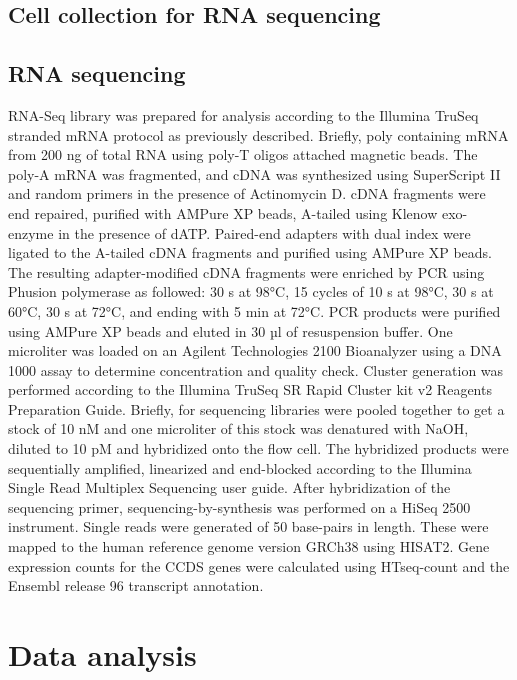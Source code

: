 \subsection*{Cell collection for RNA sequencing}

\subsection*{RNA sequencing}

RNA-Seq library was prepared for analysis according to the Illumina TruSeq stranded mRNA protocol as previously described\cite{Birkhoff_2020,Heshusius_2022}. Briefly, poly containing mRNA from 200 ng of total RNA using poly-T oligos attached magnetic beads. The poly-A mRNA was fragmented, and cDNA was synthesized using SuperScript II and random primers in the presence of Actinomycin D. cDNA fragments were end repaired, purified with AMPure XP beads, A-tailed using Klenow exo-enzyme in the presence of dATP. Paired-end adapters with dual index were ligated to the A-tailed cDNA fragments and purified using AMPure XP beads. The resulting adapter-modified cDNA fragments were enriched by PCR using Phusion polymerase as followed: 30 s at 98°C, 15 cycles of 10 s at 98°C, 30 s at 60°C, 30 s at 72°C, and ending with 5 min at 72°C. PCR products were purified using AMPure XP beads and eluted in 30 µl of resuspension buffer. One microliter was loaded on an Agilent Technologies 2100 Bioanalyzer using a DNA 1000 assay to determine concentration and quality check. Cluster generation was performed according to the Illumina TruSeq SR Rapid Cluster kit v2 Reagents Preparation Guide. Briefly, for sequencing libraries were pooled together to get a stock of 10 nM and one microliter of this stock was denatured with NaOH, diluted to 10 pM and hybridized onto the flow cell. The hybridized products were sequentially amplified, linearized and end-blocked according to the Illumina Single Read Multiplex Sequencing user guide. After hybridization of the sequencing primer, sequencing-by-synthesis was performed on a HiSeq 2500 instrument. Single reads were generated of 50 base-pairs in length. These were mapped to the human reference genome version GRCh38 using HISAT2\cite{Kim_2015}. Gene expression counts for the CCDS genes were calculated using HTseq-count\cite{Anders_2014} and the Ensembl release 96 transcript annotation\cite{Howe_2020}.

\section*{Data analysis}


